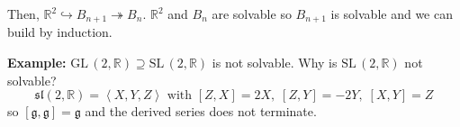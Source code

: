 \documentclass[12pt]{article}
\newcommand{\R}{\mathbb{R}}
\newcommand{\brak}[1]{\left\langle #1 \right\rangle}
\newcommand{\SL}{\text{SL}\,}
\newcommand{\GL}{\text{GL}\,}
\newcommand{\g}{\mathfrak{g}}
\newcommand{\slf}{\mathfrak{sl}}
\newenvironment*{tbox}[2][gray]{
    \begin{tcolorbox}[
        parbox=false,
        colback=#1!5!white,
        colframe=#1!75!black,
        breakable,
        title={#2}
    ]}
    {\end{tcolorbox}}
\begin{document}
\begin{tbox}{\textbf{Claim:} The upper triangular matrices ($U_n$) are solvable}
        Then, $\R^2 \hookrightarrow B_{n+1} \twoheadrightarrow B_n$. $\R^2$ and $B_n$ are solvable so $B_{n+1}$ is solvable and we can build by induction. 
    \end{tbox}

    \textbf{Example:} $\GL(2, \R) \supseteq \SL(2, \R)$ is not solvable. Why is $\SL(2, \R)$ not solvable? 
    \[\slf(2, \R) = \brak{X, Y, Z} \text{ with } [Z, X] = 2X,\; [Z, Y] = -2Y, \; [X, Y] = Z\]
    so $[\g, \g] = \g$ and the derived series does not terminate. 
\end{document}
